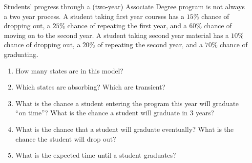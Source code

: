 \documentclass[12pt]{article}
\begin{document}
\begin{exercise}
    Students' progress through a (two-year) Associate Degree program is
    not always a two year process.  A student taking first year courses
    has a \( 15\% \) chance of dropping out, a \( 25\% \) chance of
    repeating the first year, and a \( 60\% \) chance of moving on to
    the second year.  A student taking second year material has a \( 10\%
    \) chance of dropping out, a \( 20\% \) of repeating the second
    year, and a \( 70\% \) chance of graduating.
    \begin{enumerate}[label=(\alph*)]
    \item
        How many states are in this model?
    \item
        Which states are absorbing?  Which are transient?
    \item
        What is the chance a student entering the program this year will
        graduate ``on time''?  What is the chance a student will
        graduate in 3 years?
    \item
        What is the chance that a student will graduate eventually? What
        is the chance the student will drop out?
    \item
        What is the expected time until a student graduates?
      \end{enumerate}
\end{exercise}      
\end{document}
